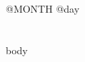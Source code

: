 \documentclass[11pt,letterpaper]{article}
\begin{document}
\univlogo

{\Huge @MONTH @day}

\section*{ }

{{ body }}
\end{document}
